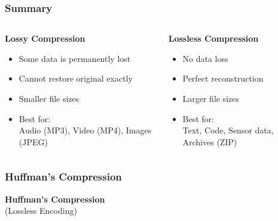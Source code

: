 \documentclass[10pt,aspectratio=43]{beamer}
\begin{document}
\begin{frame}
    \frametitle{\textcolor{myMaroon}{Summary}}
    \begin{columns}[T]
        \begin{column}{0.48\textwidth}
            \centering
            \textcolor{myMaroon}{\textbf{Lossy Compression}}
            \begin{itemize}
                \item Some data is permanently lost
                \item Cannot restore original exactly
                \item Smaller file sizes
                \item Best for: \\
                Audio (MP3), Video (MP4), Images (JPEG)
            \end{itemize}
        \end{column}
        
        \begin{column}{0.48\textwidth}
            \centering
            \textcolor{myMaroon}{\textbf{Lossless Compression}}
            \begin{itemize}
                \item No data loss
                \item Perfect reconstruction
                \item Larger file sizes
                \item Best for: \\
                Text, Code, Sensor data, Archives (ZIP)
            \end{itemize}
        \end{column}
    \end{columns}


\end{frame}



\begin{frame}
    \frametitle{\textcolor{myMaroon}{Huffman's Compression}}
    \begin{center}
        {\Large \textbf{\textcolor{myMaroon}{Huffman's Compression}}} \\
        \vspace{0.3cm}
        {\large \textcolor{myBlue}{(Lossless Encoding)}}
    \end{center}

\end{frame}
\end{document}
